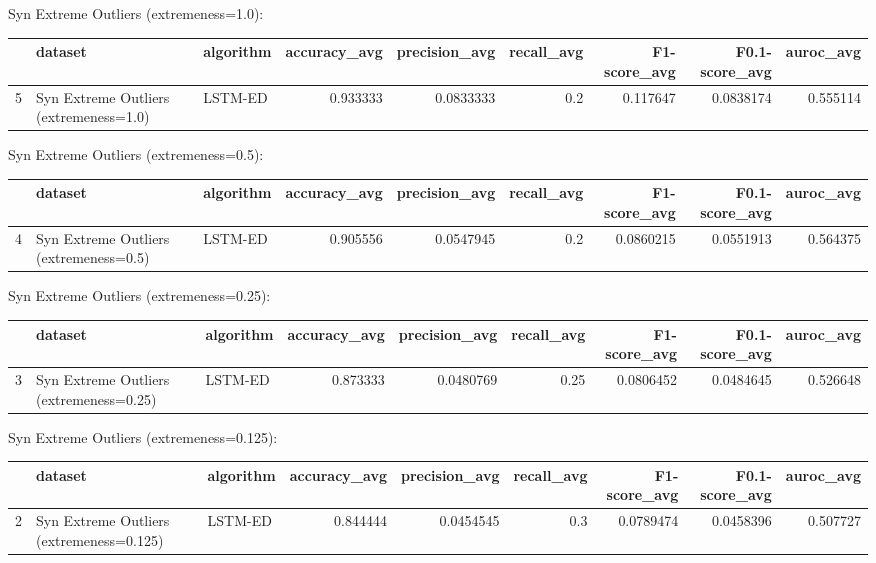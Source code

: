 Syn Extreme Outliers (extremeness=1.0):

\begin{tabular}{rllrrrrrr}
\hline
    & dataset                                & algorithm   &   accuracy\_avg &   precision\_avg &   recall\_avg &   F1-score\_avg &   F0.1-score\_avg &   auroc\_avg \\
\hline
  5 & Syn Extreme Outliers (extremeness=1.0) & LSTM-ED     &       0.933333 &       0.0833333 &          0.2 &       0.117647 &        0.0838174 &    0.555114 \\
\hline
\end{tabular}

Syn Extreme Outliers (extremeness=0.5):

\begin{tabular}{rllrrrrrr}
\hline
    & dataset                                & algorithm   &   accuracy\_avg &   precision\_avg &   recall\_avg &   F1-score\_avg &   F0.1-score\_avg &   auroc\_avg \\
\hline
  4 & Syn Extreme Outliers (extremeness=0.5) & LSTM-ED     &       0.905556 &       0.0547945 &          0.2 &      0.0860215 &        0.0551913 &    0.564375 \\
\hline
\end{tabular}

Syn Extreme Outliers (extremeness=0.25):

\begin{tabular}{rllrrrrrr}
\hline
    & dataset                                 & algorithm   &   accuracy\_avg &   precision\_avg &   recall\_avg &   F1-score\_avg &   F0.1-score\_avg &   auroc\_avg \\
\hline
  3 & Syn Extreme Outliers (extremeness=0.25) & LSTM-ED     &       0.873333 &       0.0480769 &         0.25 &      0.0806452 &        0.0484645 &    0.526648 \\
\hline
\end{tabular}

Syn Extreme Outliers (extremeness=0.125):

\begin{tabular}{rllrrrrrr}
\hline
    & dataset                                  & algorithm   &   accuracy\_avg &   precision\_avg &   recall\_avg &   F1-score\_avg &   F0.1-score\_avg &   auroc\_avg \\
\hline
  2 & Syn Extreme Outliers (extremeness=0.125) & LSTM-ED     &       0.844444 &       0.0454545 &          0.3 &      0.0789474 &        0.0458396 &    0.507727 \\
\hline
\end{tabular}

